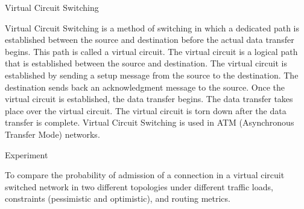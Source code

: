 
\begin{section}{Virtual Circuit Switching}

Virtual Circuit Switching is a method of switching in which a dedicated path is established between the source and destination before the actual data transfer begins. This path is called a virtual circuit. The virtual circuit is a logical path that is established between the source and destination. The virtual circuit is established by sending a setup message from the source to the destination. The destination sends back an acknowledgment message to the source. Once the virtual circuit is established, the data transfer begins. The data transfer takes place over the virtual circuit. The virtual circuit is torn down after the data transfer is complete. Virtual Circuit Switching is used in ATM (Asynchronous Transfer Mode) networks.

\end{section}


\begin{section}{Experiment}

    To compare the probability of admission of a connection in a virtual circuit switched network in two different topologies under different traffic loads, constraints (pessimistic and optimistic), and routing metrics.

\end{section}

